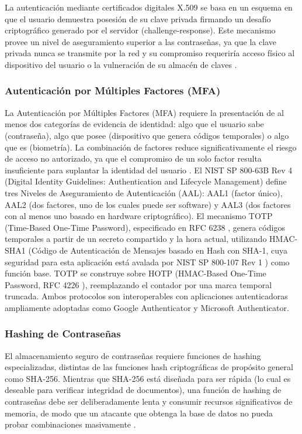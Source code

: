 La autenticación mediante certificados digitales X.509 se basa en un esquema en que el usuario demuestra posesión de su clave privada firmando un desafío criptográfico generado por el servidor (challenge-response). Este mecanismo provee un nivel de aseguramiento superior a las contraseñas, ya que la clave privada nunca se transmite por la red y su compromiso requeriría acceso físico al dispositivo del usuario o la vulneración de su almacén de claves \cite{nist2017sp80063b}.

\subsubsection{Autenticación por Múltiples Factores (MFA)}

La Autenticación por Múltiples Factores (MFA) requiere la presentación de al menos dos categorías de evidencia de identidad: algo que el usuario sabe (contraseña), algo que posee (dispositivo que genera códigos temporales) o algo que es (biometría). La combinación de factores reduce significativamente el riesgo de acceso no autorizado, ya que el compromiso de un solo factor resulta insuficiente para suplantar la identidad del usuario \cite{nist2017sp80063b}. El NIST SP 800-63B Rev 4 \cite{nist2024} (Digital Identity Guidelines: Authentication and Lifecycle Management) define tres Niveles de Aseguramiento de Autenticación (AAL): AAL1 (factor único), AAL2 (dos factores, uno de los cuales puede ser software) y AAL3 (dos factores con al menos uno basado en hardware criptográfico). El mecanismo TOTP (Time-Based One-Time Password), especificado en RFC 6238 \cite{mraihi2011}, genera códigos temporales a partir de un secreto compartido y la hora actual, utilizando HMAC-SHA1 (Código de Autenticación de Mensajes basado en Hash con SHA-1, cuya seguridad para esta aplicación está avalada por NIST SP 800-107 Rev 1 \cite{dang2012}) como función base. TOTP se construye sobre HOTP (HMAC-Based One-Time Password, RFC 4226 \cite{mraihi2005}), reemplazando el contador por una marca temporal truncada. Ambos protocolos son interoperables con aplicaciones autenticadoras ampliamente adoptadas como Google Authenticator y Microsoft Authenticator.

\subsubsection{Hashing de Contraseñas}

El almacenamiento seguro de contraseñas requiere funciones de hashing especializadas, distintas de las funciones hash criptográficas de propósito general como SHA-256. Mientras que SHA-256 está diseñada para ser rápida (lo cual es deseable para verificar integridad de documentos), una función de hashing de contraseñas debe ser deliberadamente lenta y consumir recursos significativos de memoria, de modo que un atacante que obtenga la base de datos no pueda probar combinaciones masivamente \cite{stallings2017}.

